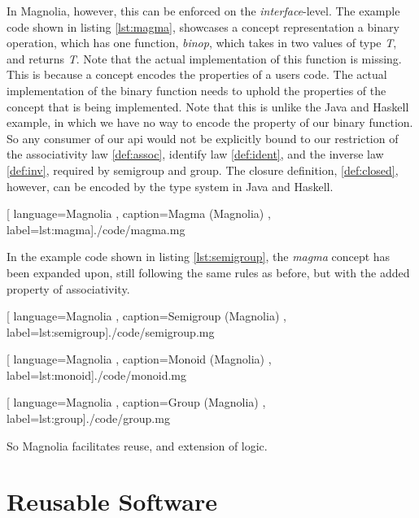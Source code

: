 In Magnolia, however, this can be enforced on the \textit{interface}-level. The
example code shown in listing \ref{lst:magma}, showcases a concept
representation a binary operation, which has one function, \textit{binop}, which
takes in two values of type \textit{T}, and returns \textit{T}. Note that the
actual implementation of this function is missing. This is because a concept
encodes the properties of a users code. The actual implementation of the
binary function needs to uphold the properties of the concept that is
being implemented. Note that this is unlike the Java and Haskell example, in
which we have no way to encode the property of our binary function. So any
consumer of our \gls{api} would not be explicitly bound to our restriction of
the associativity law \ref{def:assoc}, identify law \ref{def:ident}, and the
inverse law \ref{def:inv}, required by semigroup and group. The closure
definition, \ref{def:closed}, however, can be encoded by the type system in Java
and Haskell.

\begin{center}
  
    [ language=Magnolia
    , caption={Magma (Magnolia)}
    , label=lst:magma]{./code/magma.mg}
\end{center}

In the example code shown in listing \ref{lst:semigroup}, the \textit{magma}
concept has been expanded upon, still following the same rules as before, but
with the added property of associativity.

\begin{center}
  
    [ language=Magnolia
    , caption={Semigroup (Magnolia)}
    , label=lst:semigroup]{./code/semigroup.mg}
\end{center}

\begin{center}
  
    [ language=Magnolia
    , caption={Monoid (Magnolia)}
    , label=lst:monoid]{./code/monoid.mg}
\end{center}

\begin{center}
  
    [ language=Magnolia
    , caption={Group (Magnolia)}
    , label=lst:group]{./code/group.mg}
\end{center}

So Magnolia facilitates reuse, and extension of logic. 

\section{Reusable Software}

